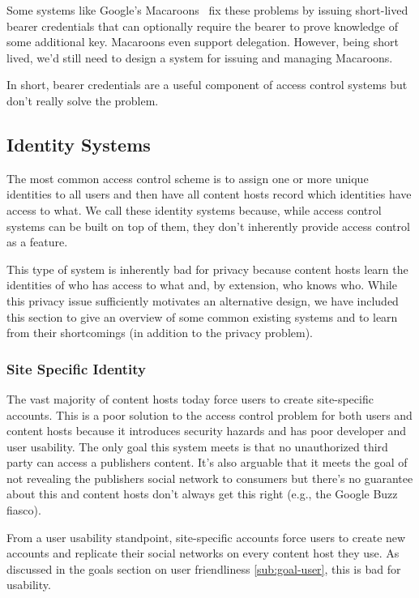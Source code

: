 \documentclass[pdftex,12pt,a4papaer]{report}
\begin{document}
Some systems like Google's Macaroons~\cite{macaroon} fix these problems by
issuing short-lived bearer credentials that can optionally require the bearer to
prove knowledge of some additional key. Macaroons even support delegation.
However, being short lived, we'd still need to design a system for issuing and
managing Macaroons.

In short, bearer credentials are a useful component of access control systems
but don't really solve the problem.

\subsection{Identity Systems}

The most common access control scheme is to assign one or more unique identities
to all users and then have all content hosts record which identities have access
to what. We call these identity systems because, while access control systems
can be built on top of them, they don't inherently provide access control as a
feature.

This type of system is inherently bad for privacy because content hosts learn
the identities of who has access to what and, by extension, who knows who. While
this privacy issue sufficiently motivates an alternative design, we have
included this section to give an overview of some common existing systems and to
learn from their shortcomings (in addition to the privacy problem).

\subsubsection{Site Specific Identity}

The vast majority of content hosts today force users to create site-specific
accounts. This is a poor solution to the access control problem for both users
and content hosts because it introduces security hazards and has poor developer
and user usability. The only goal this system meets is that no unauthorized
third party can access a publishers content. It's also arguable that it
meets the goal of not revealing the publishers social network to consumers
but there's no guarantee about this and content hosts don't always get this
right (e.g., the Google Buzz~\cite{google-buzz} fiasco).

From a user usability standpoint, site-specific accounts force users to create new
accounts and replicate their social networks on every content host they use. As
discussed in the goals section on user friendliness \ref{sub:goal-user}, this is
bad for usability.
\end{document}
